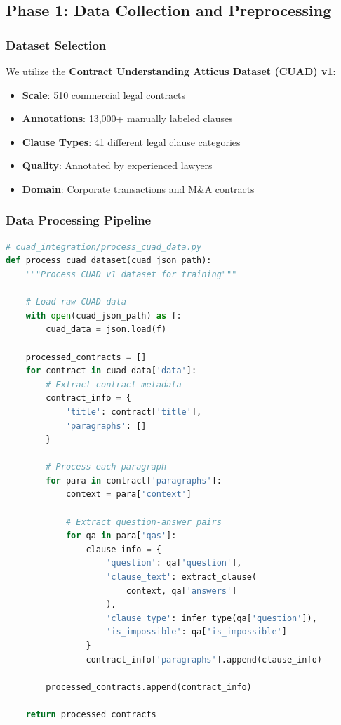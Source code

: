 \documentclass[12pt,a4paper]{article}
\begin{document}
\newpage

\subsection{Phase 1: Data Collection and Preprocessing}

\subsubsection{Dataset Selection}

We utilize the \textbf{Contract Understanding Atticus Dataset (CUAD) v1}:
\begin{itemize}
    \item \textbf{Scale}: 510 commercial legal contracts
    \item \textbf{Annotations}: 13,000+ manually labeled clauses
    \item \textbf{Clause Types}: 41 different legal clause categories
    \item \textbf{Quality}: Annotated by experienced lawyers
    \item \textbf{Domain}: Corporate transactions and M\&A contracts
\end{itemize}

\subsubsection{Data Processing Pipeline}

\begin{lstlisting}[language=Python, caption=CUAD Data Processing]
# cuad_integration/process_cuad_data.py
def process_cuad_dataset(cuad_json_path):
    """Process CUAD v1 dataset for training"""
    
    # Load raw CUAD data
    with open(cuad_json_path) as f:
        cuad_data = json.load(f)
    
    processed_contracts = []
    for contract in cuad_data['data']:
        # Extract contract metadata
        contract_info = {
            'title': contract['title'],
            'paragraphs': []
        }
        
        # Process each paragraph
        for para in contract['paragraphs']:
            context = para['context']
            
            # Extract question-answer pairs
            for qa in para['qas']:
                clause_info = {
                    'question': qa['question'],
                    'clause_text': extract_clause(
                        context, qa['answers']
                    ),
                    'clause_type': infer_type(qa['question']),
                    'is_impossible': qa['is_impossible']
                }
                contract_info['paragraphs'].append(clause_info)
        
        processed_contracts.append(contract_info)
    
    return processed_contracts
\end{lstlisting}
\end{document}
